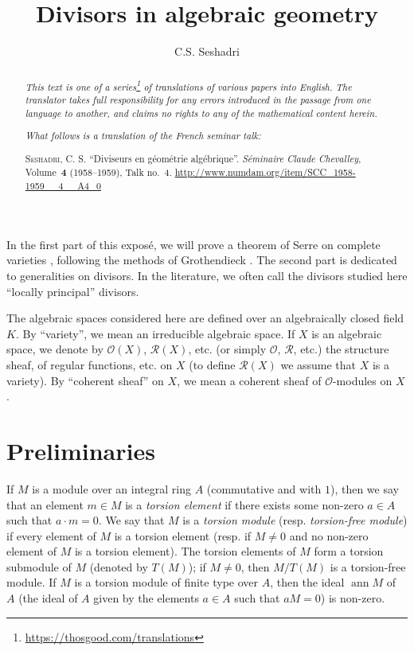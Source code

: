 \documentclass{article}
\title{Divisors in algebraic geometry}
\author{C.S. Seshadri}
\date{}
\newcommand{\doctype}{French seminar talk}
\newcommand{\origcit}{%
  \textsc{Seshadri, C. S.}
  ``Diviseurs en g\'{e}om\'{e}trie alg\'{e}brique''.
  \emph{S\'{e}minaire Claude Chevalley}, Volume~\textbf{4} (1958--1959), Talk no.~4.
  {\url{http://www.numdam.org/item/SCC_1958-1959__4__A4_0}}%
}
\newcommand{\scr}[1]{{\mathscr{#1}}}
\DeclareMathOperator{\ann}{ann}
\newcommand{\oldpage}[1]{\marginpar{\footnotesize$\Big\vert$ \textit{p.~#1}}}
\begin{document}
\maketitle
\thispagestyle{fancy}

\renewcommand{\abstractname}{Translator's note.}

\begin{abstract}
  \renewcommand*{\thefootnote}{\fnsymbol{footnote}}
  \emph{This text is one of a series\footnote{\url{https://thosgood.com/translations}} of translations of various papers into English.}
  \emph{The translator takes full responsibility for any errors introduced in the passage from one language to another, and claims no rights to any of the mathematical content herein.}

  \medskip
  
  \emph{What follows is a translation of the \doctype:}

  \medskip\noindent
  \origcit
\end{abstract}

\setcounter{footnote}{0}

\tableofcontents
\bigskip



\oldpage{4-01}
In the first part of this expos\'{e}, we will prove a theorem of Serre on complete varieties \cite{6}, following the methods of Grothendieck \cite{4}.
The second part is dedicated to generalities on divisors.
In the literature, we often call the divisors studied here ``locally principal'' divisors.

The algebraic spaces considered here are defined over an algebraically closed field $K$.
By ``variety'', we mean an irreducible algebraic space.
If $X$ is an algebraic space, we denote by $\scr{O}(X)$, $\scr{R}(X)$, etc. (or simply $\scr{O}$, $\scr{R}$, etc.) the structure sheaf, of regular functions, etc. on $X$ (to define $\scr{R}(X)$ we assume that $X$ is a variety).
By ``coherent sheaf'' on $X$, we mean a coherent sheaf of $\scr{O}$-modules on $X$.


\section{Preliminaries}
\label{section1}

\cite{4,5,6}
\medskip

If $M$ is a module over an integral ring $A$ (commutative and with $1$), then we say that an element $m\in M$ is a \emph{torsion element} if there exists some non-zero $a\in A$ such that $a\cdot m=0$.
We say that $M$ is a \emph{torsion module} (resp. \emph{torsion-free module}) if every element of $M$ is a torsion element (resp. if $M\neq0$ and no non-zero element of $M$ is a torsion element).
The torsion elements of $M$ form a torsion submodule of $M$ (denoted by $T(M)$);
if $M\neq0$, then $M/T(M)$ is a torsion-free module.
If $M$ is a torsion module of finite type over $A$, then the ideal $\ann M$ of $A$ (the ideal of $A$ given by the elements $a\in A$ such that $aM=0$) is non-zero.
\end{document}
